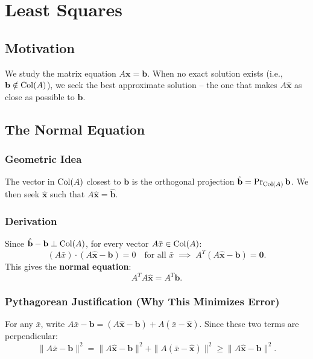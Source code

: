 \chapter{Least Squares}

\section{Motivation}

We study the matrix equation $A\mathbf{x}=\mathbf{b}$. When no exact solution exists (i.e., $\mathbf{b}\notin\operatorname{Col}(A)$), we seek the best approximate solution -- the one that makes $A\hat{\mathbf{x}}$ as close as possible to $\mathbf{b}$.

\section{The Normal Equation}

\subsection*{Geometric Idea}

The vector in $\operatorname{Col}(A)$ closest to $\mathbf{b}$ is the orthogonal projection $\hat{\mathbf{b}}=\operatorname{Pr}_{\operatorname{Col}(A)}\mathbf{b}$. We then seek $\hat{\mathbf{x}}$ such that $A\hat{\mathbf{x}}=\hat{\mathbf{b}}$.

\subsection*{Derivation}

Since $\hat{\mathbf{b}}-\mathbf{b}\perp\operatorname{Col}(A)$, for every vector $A\bar{x}\in\operatorname{Col}(A)$:
\[
  (A\bar{x})\cdot(A\hat{\mathbf{x}}-\mathbf{b}) = 0 \quad \text{for all } \bar{x}
  \;\implies\; A^T(A\hat{\mathbf{x}}-\mathbf{b})=\mathbf{0}.
\]
This gives the \textbf{normal equation}:
\[
  \boxed{A^T A\hat{\mathbf{x}} = A^T\mathbf{b}.}
\]

\subsection*{Pythagorean Justification (Why This Minimizes Error)}

For any $\bar{x}$, write $A\bar{x}-\mathbf{b} = (A\hat{\mathbf{x}}-\mathbf{b}) + A(\bar{x}-\hat{\mathbf{x}})$. Since these two terms are perpendicular:
\[
  \|A\bar{x}-\mathbf{b}\|^2 = \|A\hat{\mathbf{x}}-\mathbf{b}\|^2 + \|A(\bar{x}-\hat{\mathbf{x}})\|^2 \geq \|A\hat{\mathbf{x}}-\mathbf{b}\|^2.
\]

